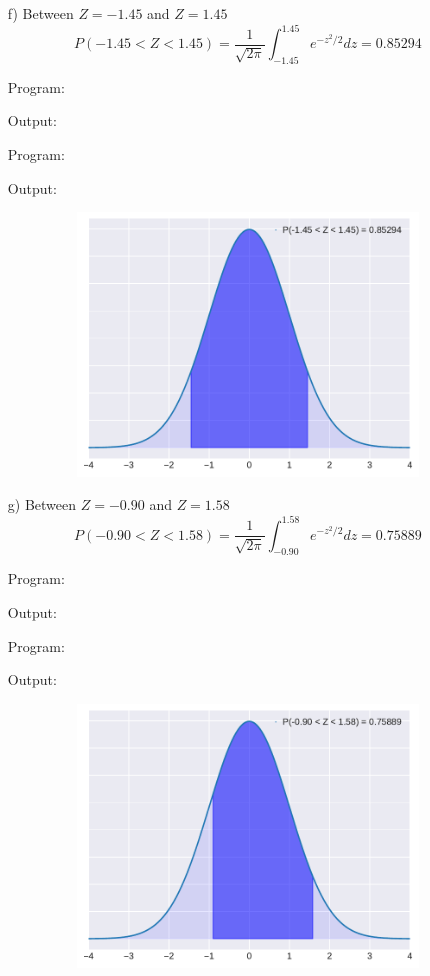 \documentclass[a4paper,11pt,openright]{report}
\begin{document}
\begin{enumerate}
\begin{enumerate}
\pagebreak

\item[f)] Between $Z = -1.45$ and $Z = 1.45$
\begin{equation*}
P(-1.45 < Z < 1.45) = \frac{1}{\sqrt{2\pi}} \int_{-1.45}^{1.45} e^{-z^{2}/2} dz = 0.85294
\end{equation*}

Program:

Output:


Program:

Output:


\begin{figure}[ht!]
\includegraphics[width=14cm,height=7cm,keepaspectratio]{norm1f.pdf}
\centering
\end{figure}

\pagebreak

\item[g)] Between $Z = -0.90$ and $Z = 1.58$
\begin{equation*}
P(-0.90 < Z < 1.58) = \frac{1}{\sqrt{2\pi}} \int_{-0.90}^{1.58} e^{-z^{2}/2} dz = 0.75889
\end{equation*}

Program:

Output:


Program:

Output:


\begin{figure}[ht!]
\includegraphics[width=14cm,height=7cm,keepaspectratio]{norm1g.pdf}
\centering
\end{figure}
\end{enumerate}


\end{enumerate}
\end{document}
